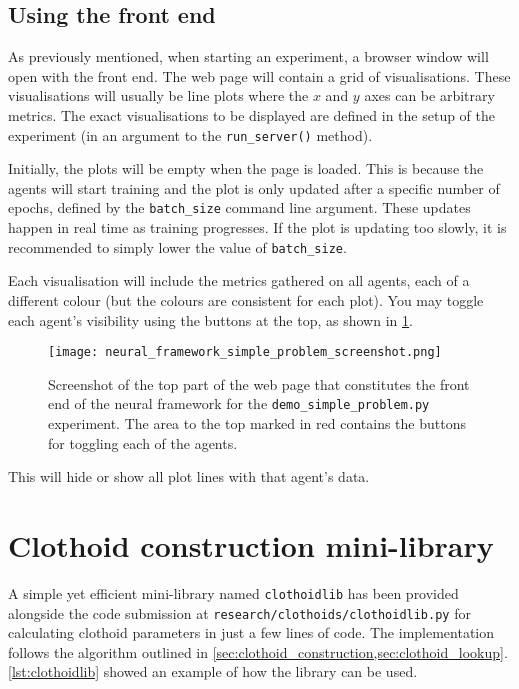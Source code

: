 \section{Using the front end}
\label{sec:using_front_end}
As previously mentioned, when starting an experiment, a browser window will open with the front end.
The web page will contain a grid of visualisations. 
These visualisations will usually be line plots where the $x$ and $y$ axes can be arbitrary metrics.
The exact visualisations to be displayed are defined in the setup of the experiment (in an argument to the \texttt{run\_server()} method).

Initially, the plots will be empty when the page is loaded. 
This is because the agents will start training and the plot is only updated after a specific number of epochs, defined by the \texttt{batch\_size} command line argument.
These updates happen in real time as training progresses.
If the plot is updating too slowly, it is recommended to simply lower the value of \texttt{batch\_size}.

Each visualisation will include the metrics gathered on all agents, each of a different colour (but the colours are consistent for each plot).
You may toggle each agent's visibility using the buttons at the top, as shown in \ref{fig:framework_front_end_screenshot}.
\begin{figure}
    \centering
    \texttt{[image: neural\_framework\_simple\_problem\_screenshot.png]}
    \caption{Screenshot of the top part of the web page that constitutes the front end of the neural framework for the \texttt{demo\_simple\_problem.py} experiment. The area to the top marked in red contains the buttons for toggling each of the agents.}
    \label{fig:framework_front_end_screenshot}
\end{figure}
This will hide or show all plot lines with that agent's data.

\chapter{Clothoid construction mini-library}
\label{app:clothoidlib}
A simple yet efficient mini-library named \texttt{clothoidlib} has been provided alongside the code submission at \texttt{research/clothoids/clothoidlib.py} for calculating clothoid parameters in just a few lines of code.
The implementation follows the algorithm outlined in \ref{sec:clothoid_construction,sec:clothoid_lookup}.
\ref{lst:clothoidlib} showed an example of how the library can be used. 

